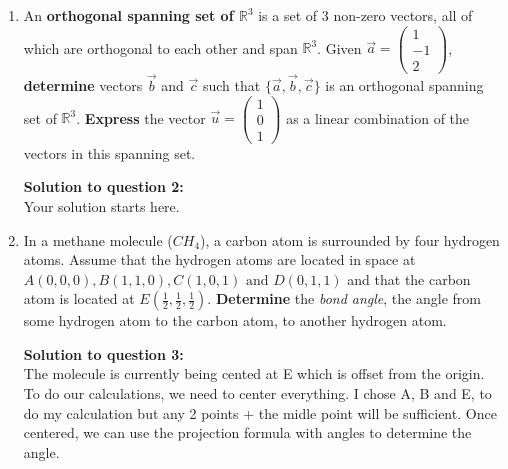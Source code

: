 \documentclass[12pt]{book}
\begin{document}
\begin{enumerate}

\newpage

\item An \textbf{orthogonal spanning set of $\mathbb{R}^3$} is a set of 3 non-zero vectors, all of which are orthogonal to each other and span $\mathbb{R}^3$. Given $\vec{a} = \left(\begin{smallmatrix} 1 \\ -1 \\ 2 \end{smallmatrix}\right)$, \textbf{determine} vectors $\vec{b}$ and $\vec{c}$ such that $\{\vec{a}, \vec{b}, \vec{c}\}$ is an orthogonal spanning set of $\mathbb{R}^3$. \textbf{Express} the vector $\vec{u}= \left(\begin{smallmatrix} 1 \\ 0 \\ 1 \end{smallmatrix}\right)$ as a linear combination of the vectors in this spanning set. 

\vspace{0.3cm} 
\textbf{Solution to question 2:}\\
 Your solution starts here.
\vspace{0.3cm}

\newpage

\item In a methane molecule ($CH_4$), a carbon atom is surrounded by four hydrogen atoms. Assume that the hydrogen atoms are located in space at $A(0,0,0), B(1,1,0), C(1,0,1) \textrm{ and } D(0,1,1)$ and that the carbon atom is located at $E\left(\frac{1}{2},\frac{1}{2},\frac{1}{2}\right)$. \textbf{Determine} the \emph{bond angle}, the angle from some hydrogen atom to the carbon atom, to another hydrogen atom.

\vspace{0.3cm} 
\textbf{Solution to question 3:}\\
 The molecule is currently being cented at E which is offset from the 
 origin. To do our calculations, we need to center everything. I chose 
 A, B and E, to do my calculation but any 2 points + the midle point will be 
 sufficient. Once centered, we can use the projection formula with angles to 
 determine the angle.
\vspace{0.3cm}


\end{enumerate}
\end{document}

